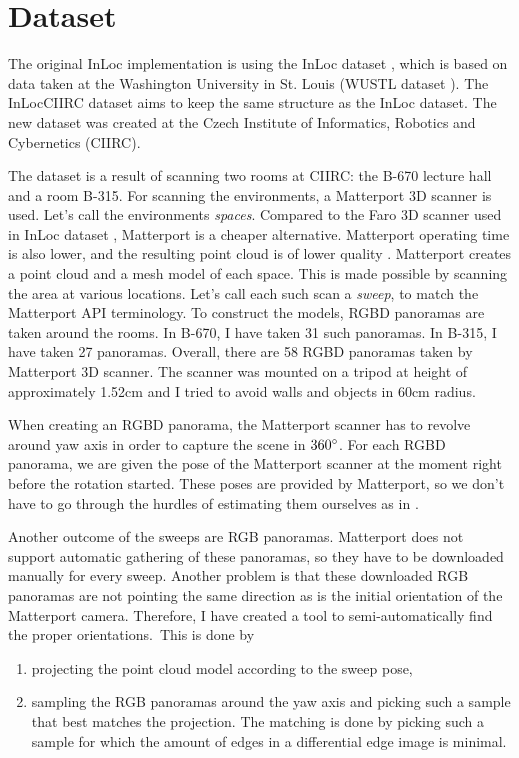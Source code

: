 \documentclass[twoside]{ctuthesis}
\theoremstyle{plain}
\theoremstyle{definition}
\theoremstyle{note}
\begin{document}
\chapter{Dataset}
\label{chapter:dataset}
The original InLoc implementation is using the InLoc dataset \cite{taira2018inloc}, which is based on data taken at the Washington University in St. Louis (WUSTL dataset \cite{wijmans17rgbd}). The InLocCIIRC dataset aims to keep the same structure as the InLoc dataset. The new dataset was created at the Czech Institute of Informatics, Robotics and Cybernetics (CIIRC).

The dataset is a result of scanning two rooms at CIIRC: the B-670 lecture hall and a room B-315. For scanning the environments, a Matterport 3D scanner is used. Let's call the environments \emph{spaces}. Compared to the Faro 3D scanner used in InLoc dataset \cite{taira2018inloc}, Matterport is a cheaper alternative. Matterport operating time is also lower, and the resulting point cloud is of lower quality \cite{wijmans17rgbd}. Matterport creates a point cloud and a mesh model of each space. This is made possible by scanning the area at various locations. Let's call each such scan a \emph{sweep}, to match the Matterport API terminology. To construct the models, RGBD panoramas are taken around the rooms. In B-670, I have taken 31 such panoramas. In B-315, I have taken 27 panoramas. Overall, there are 58 RGBD panoramas taken by Matterport 3D scanner. The scanner was mounted on a tripod at height of approximately 1.52cm and I tried to avoid walls and objects in 60cm radius.

When creating an RGBD panorama, the Matterport scanner has to revolve around yaw axis in order to capture the scene in $360\degree$. For each RGBD panorama, we are given the pose of the Matterport scanner at the moment right before the rotation started. These poses are provided by Matterport, so we don't have to go through the hurdles of estimating them ourselves as in \cite{wijmans17rgbd}.

Another outcome of the sweeps are RGB panoramas. Matterport does not support automatic gathering of these panoramas, so they have to be downloaded manually for every sweep. Another problem is that these downloaded RGB panoramas are not pointing the same direction as is the initial orientation of the Matterport camera. Therefore, I have created a tool to semi-automatically find the proper orientations. This is done by

\begin{enumerate}
	\item projecting the point cloud model according to the sweep pose,
	\item sampling the RGB panoramas around the yaw axis and picking such a sample that best matches the projection. The matching is done by picking such a sample for which the amount of edges in a differential edge image is minimal.
\end{enumerate}
\end{document}
